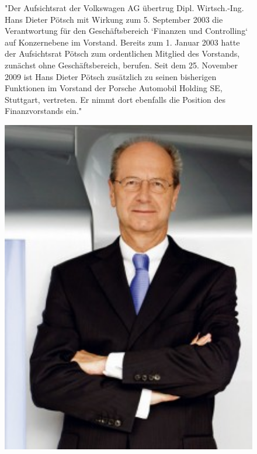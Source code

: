 \documentclass[12pt]{article}
\begin{document}
\begin{figure}[here!]
	\centering
	\begin{minipage}[h]{0.65\textwidth}
		"Der Aufsichtsrat der Volkswagen AG übertrug Dipl. Wirtsch.-Ing. Hans Dieter Pötsch mit Wirkung zum 5. September 2003 die Verantwortung für den Geschäftsbereich ‘Finanzen und Controlling‘ auf Konzernebene im Vorstand. Bereits zum 1. Januar 2003 hatte der Aufsichtsrat Pötsch zum ordentlichen Mitglied des Vorstands, zunächst ohne Geschäftsbereich, berufen. Seit dem 25. November 2009 ist Hans Dieter Pötsch zusätzlich zu seinen bisherigen Funktionen im Vorstand der Porsche Automobil Holding SE, Stuttgart, vertreten. Er nimmt dort ebenfalls die Position des Finanzvorstands ein."\cite{poetschbio}
	\end{minipage}
	\begin{minipage}[h]{0.10\textwidth}
		\hspace{1cm} 
	\end{minipage}
	\begin{minipage}[h]{0.20\textwidth}
		\centering
		\includegraphics[width=1.0\textwidth]{images/HansPoetsch.jpg}
		\label{fig:vorstandvw7}
		\cite{dppic}
	\end{minipage}
\end{figure}
\end{document}
